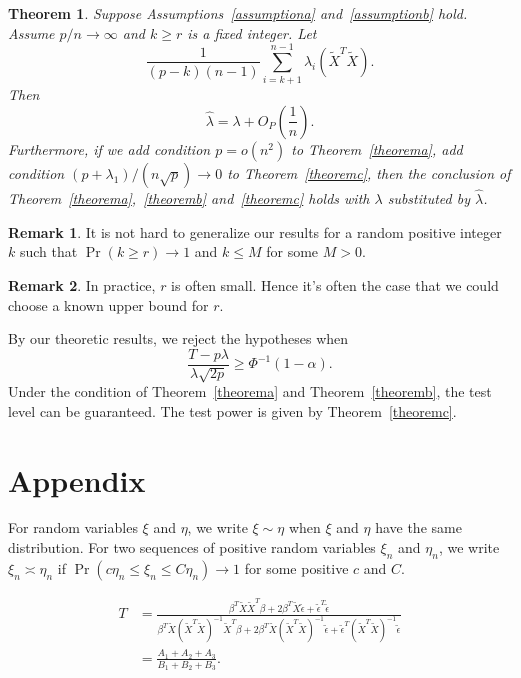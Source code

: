 \documentclass[review]{elsarticle}
\theoremstyle{plain}
\newtheorem{theorem}{\quad\quad Theorem}
\theoremstyle{definition}
\newtheorem{remark}{\quad\quad Remark}
\theoremstyle{remark}
\begin{document}
\begin{theorem}\label{theoremLambda}
    Suppose Assumptions~\ref{assumptiona} and~\ref{assumptionb} hold.
    Assume $p/n \to  \infty$ and $k\geq r$ is a fixed integer. Let
     \begin{equation*}
    \frac{1}{(p-k)(n-1)}\sum_{i=k+1}^{n-1}\lambda_{i}(\tilde{X}^T\tilde{X}).
     \end{equation*}
     Then
    \begin{equation*}
        \hat{\lambda}=\lambda +O_P(\frac{1}{n}).
    \end{equation*}
    Furthermore, if we add condition $p=o(n^2)$ to Theorem~\ref{theorema}, add condition ${(p+\lambda_1)}/{(n\sqrt{p})}\to 0$ to Theorem~\ref{theoremc}, then
    the conclusion of Theorem~\ref{theorema},~\ref{theoremb} and~\ref{theoremc} holds with $\lambda$ substituted by $\hat{\lambda}$.
\end{theorem}
\begin{remark}
It is not hard to generalize our results for  a random positive integer $k$ such that $\Pr(k\geq r)\to 1$ and $k\leq M$ for some $M>0$.
\end{remark}
\begin{remark}
In practice, $r$ is often small. Hence it's often the case that we could choose a known upper bound for $r$.
\end{remark}
By our theoretic results, we reject the hypotheses when 
\begin{equation*}
    \frac{T-p\lambda}{\lambda\sqrt{2p}}\geq \Phi^{-1}(1-\alpha).
\end{equation*}
Under the condition of Theorem~\ref{theorema} and Theorem~\ref{theoremb}, the test level can be guaranteed. The test power is given by Theorem~\ref{theoremc}.

\section{Appendix}

For random variables $\xi$ and $\eta$, we write $\xi\sim \eta$ when $\xi$ and $\eta$ have the same distribution. For two sequences of positive random variables $\xi_n$ and $\eta_n$, we write $\xi_n\asymp \eta_n$ if $\Pr(c\eta_n\leq\xi_n\leq C\eta_n)\to 1$ for some positive $c$ and $C$.

\begin{equation}\label{Tdecom}
    \begin{aligned}
        T&=\frac{\beta^T \tilde{X}\tilde{X}^T \beta+
        2\beta^T \tilde{X}\tilde{\epsilon}+
        \tilde{\epsilon}^T\tilde{\epsilon}
    }{\beta^T \tilde{X}{(\tilde{X}^T\tilde{X})}^{-1}\tilde{X}^T \beta+
        2\beta^T \tilde{X}{(\tilde{X}^T\tilde{X})}^{-1}\tilde{\epsilon}+
        \tilde{\epsilon}^T{(\tilde{X}^T\tilde{X})}^{-1}\tilde{\epsilon}
    }\\
        &=\frac{A_1+A_2+A_3}{B_1+B_2+B_3}.
    \end{aligned}
\end{equation}
\end{document}
